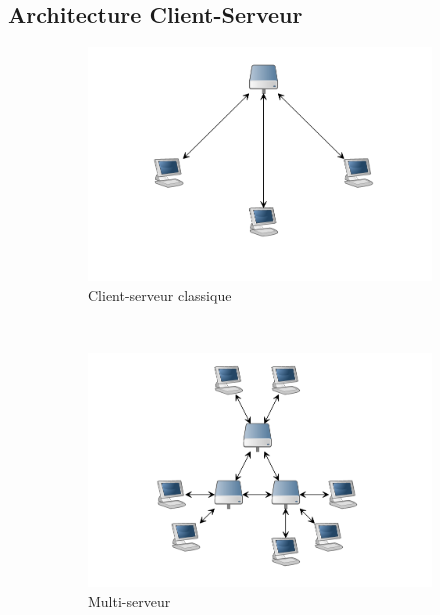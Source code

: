 \subsection{Architecture Client-Serveur}
\begin{figure}[b!]
		\centering
		\begin{subfigure}[t]{0.3\textwidth}
			\includegraphics[width=\textwidth]{cs.png}
			\caption{Client-serveur classique}
			\label{fig:archi_cs}
		\end{subfigure}
		~
		\begin{subfigure}[t]{0.3\textwidth}
			\includegraphics[width=\textwidth]{mcs.png}
			\caption{Multi-serveur}
			\label{fig:archi_mcs}
		\end{subfigure}
		~
		\begin{subfigure}[t]{0.3\textwidth}

\end{subfigure}
\end{figure}
